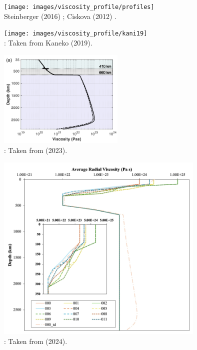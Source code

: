 \begin{center}
\texttt{[image: images/viscosity\_profile/profiles]}\\
{\captionfont Steinberger (2016) \cite{stei16}; 
Ciskova \etal (2012) \cite{civs12}.}
\end{center}

\begin{center}
\texttt{[image: images/viscosity\_profile/kani19]}\\
{\captionfont \twothousandnineteen: Taken from Kaneko \etal \cite{kani19} (2019).}
\end{center}

\begin{center}
\includegraphics[width=6cm]{images/viscosity_profile/nemi23}\\
{\captionfont \twothousandtwentythree: Taken from \textcite{nemi23} (2023).}
\end{center}

\begin{center}
\includegraphics[width=10cm]{images/viscosity_profile/pldp24}\\
{\captionfont \twothousandtwentyfour: Taken from \textcite{pldp24} (2024).}
\end{center}



